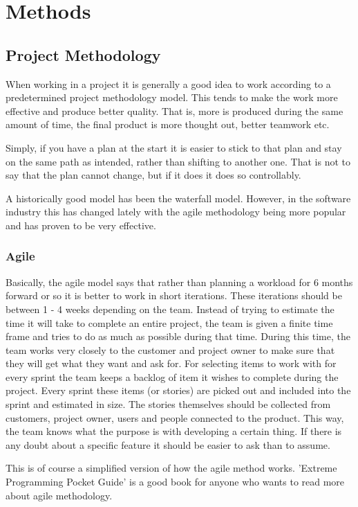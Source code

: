 \section{Methods}


\subsection{Project Methodology}
When working in a project it is generally a good idea to work according to a predetermined project methodology model. This tends to make the work more effective and produce better quality. That is, more is produced during the same amount of time, the final product is more thought out, better teamwork etc.

Simply, if you have a plan at the start it is easier to stick to that plan and stay on the same path as intended, rather than shifting to another one. That is not to say that the plan cannot change, but if it does it does so controllably.

A historically good model has been the waterfall model. However, in the software industry this has changed lately with the agile methodology being more popular and has proven to be very effective.

\subsubsection{Agile}
Basically, the agile model says that rather than planning a workload for 6 months forward or so it is better to work in short iterations. These iterations should be between 1 - 4 weeks depending on the team.
Instead of trying to estimate the time it will take to complete an entire project, the team is given a finite time frame and tries to do as much as possible during that time. During this time, the team works very closely to the customer and project owner to make sure that they will get what they want and ask for.
For selecting items to work with for every sprint the team keeps a backlog of item it wishes to complete during the project. Every sprint these items (or stories) are picked out and included into the sprint and estimated in size. The stories themselves should be collected from customers, project owner, users and people connected to the product. This way, the team knows what the purpose is with developing a certain thing. If there is any doubt about a specific feature it should be easier to ask than to assume.

This is of course a simplified version of how the agile method works. 'Extreme Programming Pocket Guide' is a good book for anyone who wants to read more about agile methodology.

